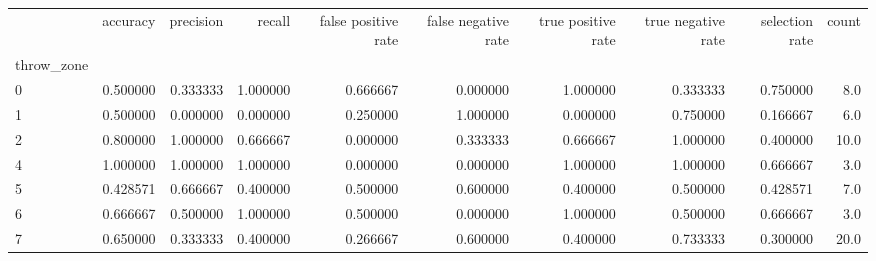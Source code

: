 \begin{tabular}{lrrrrrrrrr}
\toprule
{} &  accuracy &  precision &    recall &  false positive rate &  false negative rate &  true positive rate &  true negative rate &  selection rate &  count \\
throw\_zone &           &            &           &                      &                      &                     &                     &                 &        \\
\midrule
0          &  0.500000 &   0.333333 &  1.000000 &             0.666667 &             0.000000 &            1.000000 &            0.333333 &        0.750000 &    8.0 \\
1          &  0.500000 &   0.000000 &  0.000000 &             0.250000 &             1.000000 &            0.000000 &            0.750000 &        0.166667 &    6.0 \\
2          &  0.800000 &   1.000000 &  0.666667 &             0.000000 &             0.333333 &            0.666667 &            1.000000 &        0.400000 &   10.0 \\
4          &  1.000000 &   1.000000 &  1.000000 &             0.000000 &             0.000000 &            1.000000 &            1.000000 &        0.666667 &    3.0 \\
5          &  0.428571 &   0.666667 &  0.400000 &             0.500000 &             0.600000 &            0.400000 &            0.500000 &        0.428571 &    7.0 \\
6          &  0.666667 &   0.500000 &  1.000000 &             0.500000 &             0.000000 &            1.000000 &            0.500000 &        0.666667 &    3.0 \\
7          &  0.650000 &   0.333333 &  0.400000 &             0.266667 &             0.600000 &            0.400000 &            0.733333 &        0.300000 &   20.0 \\
\bottomrule
\end{tabular}
